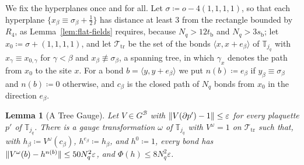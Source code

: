 \documentclass[11pt]{preprint}
\DeclarePairedDelimiter{\norm}{\lVert}{\rVert}
\numberwithin{equation}{section}
\newtheorem{lemma}[theorem]{Lemma}
\theoremstyle{definition}
\theoremstyle{remark}
\theoremstyle{plain}
\begin{document}
We fix the hyperplanes once and for all. Let $\sigma \coloneqq o - 4(1, 1, 1, 1)$, so that each hyperplane $\{ x_\beta \equiv \sigma_\beta + \frac12 \}$ has distance at least $3$ from the rectangle bounded by $R_4$, as Lemma~\ref{lem:flat-fields} requires, because $N_q > 12t_{\mathrm b}$ and $N_q > 3s_{\mathrm b}$; let $x_0 \coloneqq \sigma + (1, 1, 1, 1)$, and let $\mathcal T_{\mathrm{tr}}$ be the set of the bonds $\langle x, x + e_\beta\rangle$ of $\mathbb T_{j_q}$ with $x_\gamma \equiv x_{0,\gamma}$ for $\gamma < \beta$ and $x_\beta \not\equiv \sigma_\beta$, a spanning tree, in which $\gamma_x$ denotes the path from $x_0$ to the site $x$. For a bond $b = \langle y, y + e_\beta\rangle$ we put $n(b) \coloneqq e_\beta$ if $y_\beta \equiv \sigma_\beta$ and $n(b) \coloneqq 0$ otherwise, and $c_\beta$ is the closed path of $N_q$ bonds from $x_0$ in the direction $e_\beta$.

\begin{lemma}[A Tree Gauge]\label{lem:tree-gauge}
Let $V \in G^{\mathcal B}$ with $\norm{V(\partial p') - 1} \leq \varepsilon$ for every plaquette $p'$ of $\mathbb T_{j_q}$. There is a gauge transformation $\omega$ of $\mathbb T_{j_q}$ with $V^\omega = 1$ on $\mathcal T_{\mathrm{tr}}$ such that, with $h_\beta \coloneqq V^\omega(c_\beta)$, $h^{e_\beta} \coloneqq h_\beta$, and $h^0 \coloneqq 1$, every bond has $\norm{V^\omega(b) - h^{n(b)}} \leq 50N_q^2\varepsilon$, and $\Phi(h) \leq 8N_q^2\varepsilon$.
\end{lemma}
\end{document}
